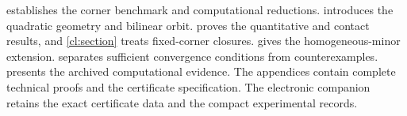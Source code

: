  establishes the corner benchmark and computational
reductions.  introduces the quadratic geometry
and bilinear orbit.  proves the quantitative and contact
results, and \cref{cl:section} treats fixed-corner closures.
 gives the homogeneous-minor extension.
 separates sufficient convergence conditions from
counterexamples.  presents the archived computational
evidence. The appendices contain complete technical proofs and the
certificate specification. The electronic companion retains the exact
certificate data and the compact experimental records.
